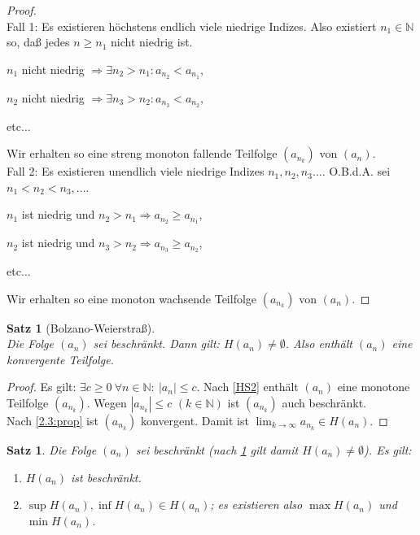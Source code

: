 \documentclass[12pt]{extreport} %
\newcommand{\N}{\mathbb{N}}
\theoremstyle{named}
\theoremstyle{itshape}
\newtheorem{satz}[unnamedtheorem]{Satz}
\theoremstyle{normal}
\begin{document}
\begin{proof} ~\\
	Fall 1: Es existieren höchstens endlich viele niedrige Indizes. Also existiert $n_{1} \in \N$ so, da{\ss} jedes $n \geq n_{1}$ nicht niedrig ist.
	\begin{description}
		\item $n_{1}$ nicht niedrig $\Rightarrow \exists n_{2} > n_{1} : a_{n_{2}} < a_{n_{1}}$,
		\item $n_{2}$ nicht niedrig $\Rightarrow \exists n_{3} > n_{2} : a_{n_{3}} < a_{n_{2}}$,
		\item etc$\dotsc$
	\end{description}
	Wir erhalten so eine streng monoton fallende Teilfolge $(a_{n_{k}})$ von $(a_n)$. \\
	Fall 2: Es existieren unendlich viele niedrige Indizes $n_{1}, n_{2},n_3 \dotsc$. O.B.d.A. sei $n_{1} < n_{2} < n_3, \dotsc$.
	\begin{description}
		\item $n_{1}$ ist niedrig und $n_{2} > n_{1} \Rightarrow a_{n_{2}} \geq a_{n_{1}}$,
		\item $n_{2}$ ist niedrig und $n_{3} > n_{2} \Rightarrow a_{n_{3}} \geq a_{n_{2}}$,
		\item etc$\dotsc$
	\end{description}
	Wir erhalten so eine monoton wachsende Teilfolge $(a_{n_{k}})$ von $(a_n)$.
\end{proof}

\begin{satz}[Bolzano-Weierstra{\ss}] \label{2.12:satz-BolzanoWeierstrass}  ~\\
	Die Folge $(a_{n})$ sei beschränkt. Dann gilt: $H(a_{n}) \neq \emptyset$. Also enthält $(a_{n})$ eine konvergente Teilfolge.
\end{satz}

\begin{proof}
	Es gilt: $\exists c \geq 0 ~ \forall n \in \N: ~ |a_{n}| \leq c$. Nach \ref{HS2} enthält $(a_{n})$ eine monotone Teilfolge $(a_{n_{k}})$. 
	Wegen $|a_{n_{k}}| \leq c$ $(k \in \N)$ ist $(a_{n_{k}})$ auch beschränkt. \\
	Nach \ref{2.3:prop} ist $(a_{n_{k}})$ konvergent. Damit ist $\lim_{k \rightarrow \infty} a_{n_{k}} \in H(a_{n})$.
\end{proof}

\begin{satz} \label{2.13:satz}
	Die Folge $(a_{n})$ sei beschränkt (nach \ref{2.12:satz-BolzanoWeierstrass} gilt damit $H(a_{n}) \neq \emptyset$). Es gilt:
	\begin{enumerate}
		\item $H(a_{n})$ ist beschränkt.
		\item $\sup H(a_{n}), \inf H(a_{n}) \in H(a_{n})$; es existieren also $\max H(a_{n})$ und $\min H(a_{n})$.
	\end{enumerate}
\end{satz}
\end{document}
